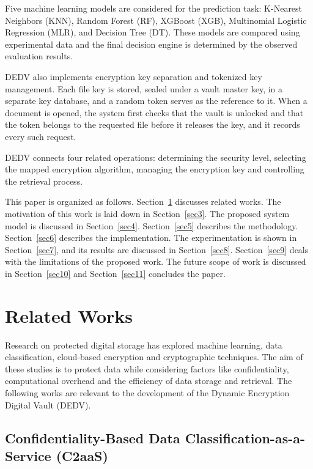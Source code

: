 \documentclass[pdflatex,sn-mathphys-num]{sn-jnl}
\begin{document}
Five machine learning models are considered for the prediction task: K-Nearest Neighbors (KNN),
Random Forest (RF), XGBoost (XGB), Multinomial Logistic Regression (MLR), and Decision Tree (DT).
These models are compared using experimental data and the final decision engine is determined by
the observed evaluation results.

DEDV also implements encryption key separation and tokenized key management. Each file key is
stored, sealed under a vault master key, in a separate key database, and a random token serves as
the reference to it. When a document is opened, the system first checks that the vault is unlocked
and that the token belongs to the requested file before it releases the key, and it records every
such request.

DEDV connects four related operations: determining the security level, selecting the mapped
encryption algorithm, managing the encryption key and controlling the retrieval process.

This paper is organized as follows. Section~\ref{sec2} discusses related works. The motivation of
this work is laid down in Section~\ref{sec3}. The proposed system model is discussed in
Section~\ref{sec4}. Section~\ref{sec5} describes the methodology. Section~\ref{sec6} describes the
implementation. The experimentation is shown in Section~\ref{sec7}, and its results are discussed
in Section~\ref{sec8}. Section~\ref{sec9} deals with the limitations of the proposed work. The
future scope of work is discussed in Section~\ref{sec10} and Section~\ref{sec11} concludes the
paper.

\section{Related Works}\label{sec2}

Research on protected digital storage has explored machine learning, data classification,
cloud-based encryption and cryptographic techniques. The aim of these studies is to protect data
while considering factors like confidentiality, computational overhead and the efficiency of data
storage and retrieval. The following works are relevant to the development of the Dynamic
Encryption Digital Vault (DEDV).

\subsection{Confidentiality-Based Data Classification-as-a-Service (C2aaS)}
\end{document}
